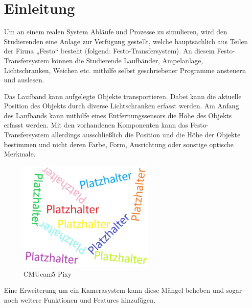 
\chapter{Einleitung}
\label{sec:Einleitung}

Um an einem realen System Abläufe und Prozesse zu simulieren, wird den Studierenden eine Anlage zur Verfügung gestellt, welche hauptsächlich aus Teilen der Firma „Festo“ besteht (folgend: Festo-Transfersystem). An diesem Festo-Transfersystem können die Studierende Laufbänder, Ampelanlage, Lichtschranken, Weichen etc. mithilfe selbst geschriebener Programme ansteuern und auslesen. 

Das Laufband kann aufgelegte Objekte transportieren. Dabei kann die aktuelle Position des Objekts durch diverse Lichtschranken erfasst werden. Am Anfang des Laufbands kann mithilfe eines Entfernungssensors die Höhe des Objekts erfasst werden. Mit den vorhandenen Komponenten kann das Festo-Transfersystem allerdings ausschließlich die Position und die Höhe der Objekte bestimmen und nicht deren Farbe, Form, Ausrichtung oder sonstige optische Merkmale. 

\begin{figure}[htb]
    \centering
    \includegraphics[width=0.6\textwidth]{Abbildungen/Platzhalter.jpg}
    \caption[CMUcam5 Pixy \newline Quelle: \textit{http://charmedlabs.com/default/products/}]{CMUcam5 Pixy}		
    \label{fig:PixyCam}
\end{figure}

Eine Erweiterung um ein Kamerasystem kann diese Mängel beheben und sogar noch weitere Funktionen und Features hinzufügen. 

